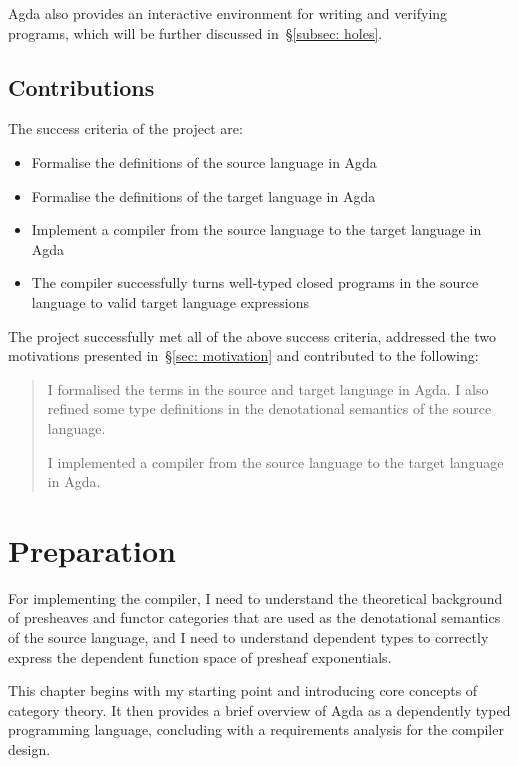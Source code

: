 \documentclass[12pt,a4paper]{report}
\makeatletter
\theoremstyle{definition}
\newcounter{motivation}
\newcommand{\secref}[1]{\S\ref{#1}}
\newcommand{\chapterminitoc}{%
  \begingroup
    \let\ps@plain\ps@empty %
    \let\ps@headings\ps@empty
    \minitoc
    \thispagestyle{empty} %
    \afterpage{\clearpage} %
  \endgroup
    \clearpage
  \addtocounter{page}{-1} %
}
\makeatother
\begin{document}
        Agda also provides an interactive environment for writing and verifying programs, which will be further discussed in~\secref{subsec: holes}.

    \section{Contributions} \label{sec: contributions}
        The success criteria of the project are:
        \begin{itemize}
            \item 
                Formalise the definitions of the source language in Agda
            \item 
                Formalise the definitions of the target language in Agda
            \item
                Implement a compiler from the source language to the target language in Agda
            \item 
                The compiler successfully turns well-typed closed programs in the source language to valid target language expressions
        \end{itemize}

        The project successfully met all of the above success criteria, addressed the two motivations presented in~\secref{sec: motivation} and contributed to the following:
        \begin{quote}            
            \savedmotivationI
            I formalised the terms in the source and target language in Agda. I also refined some type definitions in the denotational semantics of the source language.
            
            \savedmotivationII
            I implemented a compiler from the source language to the target language in Agda. 
        \end{quote}



\chapter{Preparation}
    \chapterminitoc

    For implementing the compiler, I need to understand the theoretical background of presheaves and functor categories that are used as the denotational semantics of the source language, and I need to understand dependent types to correctly express the dependent function space of presheaf exponentials. 
    
    This chapter begins with my starting point and introducing core concepts of category theory. It then provides a brief overview of Agda as a dependently typed programming language, concluding with a requirements analysis for the compiler design.
\end{document}
